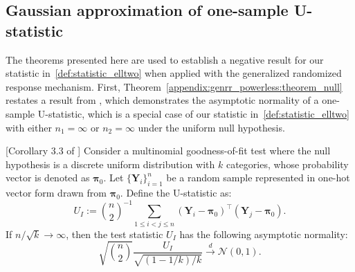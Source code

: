 \documentclass[twoside,11pt]{article}
\newcommand{\alphabetSize}{k} %
\newcommand{\sampleSize}{n}
\begin{document}
\begin{appendix}
	\subsection{Gaussian approximation of one-sample U-statistic}
	The theorems presented here are used to establish a negative result for our statistic in~\eqref{def:statistic_elltwo} when applied with the generalized randomized response mechanism. First, Theorem~\ref{appendix:genrr_powerless:theorem_null} restates a result from \citet{kim_multinomial_2020}, which demonstrates the asymptotic normality of a one-sample U-statistic, which is a special case of our statistic in~\eqref{def:statistic_elltwo} with either $n_1 = \infty$ or $n_2 = \infty$ under the uniform null hypothesis.
	\begin{theorem}\label{appendix:genrr_powerless:theorem_null}[Corollary 3.3 of \citet{kim_multinomial_2020}]
		Consider a multinomial goodness-of-fit test where the null hypothesis is a discrete uniform distribution with $\alphabetSize$ categories, whose probability vector is denoted as $\boldsymbol{\pi}_0$. Let $\{\mathbf{Y}_i \}_{i=1}^\sampleSize$ be a random sample represented in one-hot vector form drawn from $\boldsymbol{\pi}_0$. Define the U-statistic as:
		\begin{equation}\label{def:U_stat_kim_2020}
			U_I
			:=
			{\binom{n}{2}}^{-1} \sum_{1 \leq i < j \leq n} (\mathbf{Y}_i - \boldsymbol{\pi}_0)^\top (\mathbf{Y}_j - \boldsymbol{\pi}_0). 
		\end{equation}
		If $\sampleSize / \sqrt{\alphabetSize} \to \infty$, then the test statistic $U_I$ has the following asymptotic normality:
		\begin{equation*}
			\sqrt{\binom{n}{2}} \frac{U_I}{
				\sqrt{
					(1 - 1/\alphabetSize)/
					\alphabetSize
			}} \overset{d}{\longrightarrow} \mathcal{N}(0, 1).   
		\end{equation*}
	\end{theorem}
	

\end{appendix}
\end{document}
